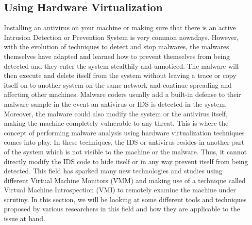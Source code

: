 \documentclass[11pt]{article}
\begin{document}
	\subsection{Using Hardware Virtualization}
	Installing an antivirus on your machine or making sure that there is an active Intrusion Detection or Prevention System is very common nowadays. However, with the evolution of techniques to detect and stop malwares, the malwares themselves have adapted and learned how to prevent themselves from being detected and they enter the system stealthily and unnoticed. The malware will then execute and delete itself from the system without leaving a trace or copy itself on to another system on the same network and continue spreading and affecting other machines. Malware coders usually add a built-in defense to their malware sample in the event an antivirus or IDS is detected in the system. Moreover, the malware could also modify the system or the antivirus itself, making the machine completely vulnerable to any threat. This is where the concept of performing malware analysis using hardware virtualization techniques comes into play. In these techniques, the IDS or antivirus resides in another part of the system which is not visible to the machine or the malware. Thus, it cannot directly modify the IDS code to hide itself or in any way prevent itself from being detected. This field has sparked many new technologies and studies using different Virtual Machine Monitors (VMM) and making use of a technique called Virtual Machine Introspection (VMI) to remotely examine the machine under scrutiny. In this section, we will be looking at some different tools and techniques proposed by various researchers in this field and how they are applicable to the issue at hand.
\end{document}
